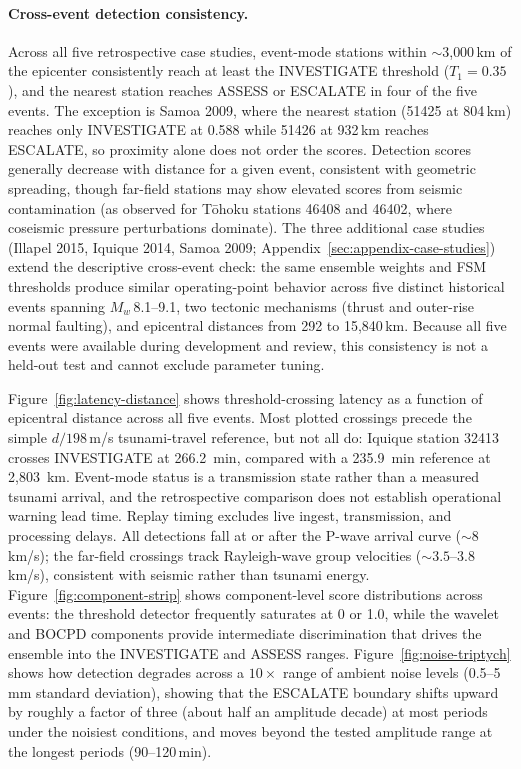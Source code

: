 \documentclass{article}
\begin{document}
\paragraph{Cross-event detection consistency.}
Across all five retrospective case studies, event-mode stations
within $\sim$3{,}000\,km of the epicenter consistently reach at
least the INVESTIGATE threshold ($T_1 = 0.35$), and the nearest
station reaches ASSESS or ESCALATE in four of the five events.
The exception is Samoa 2009, where the nearest station (51425 at
804\,km) reaches only INVESTIGATE at 0.588 while 51426 at 932\,km
reaches ESCALATE, so proximity alone does not order the scores.
Detection scores generally decrease with distance for a
given event, consistent with geometric spreading, though
far-field stations may show elevated scores from seismic
contamination (as observed for T\={o}hoku stations 46408 and
46402, where coseismic pressure perturbations dominate).
The three additional case studies (Illapel 2015, Iquique 2014,
Samoa 2009; Appendix~\ref{sec:appendix-case-studies}) extend the
descriptive cross-event check: the same ensemble weights and FSM
thresholds produce similar operating-point behavior across five
distinct historical events spanning $M_w$\,8.1--9.1, two tectonic
mechanisms (thrust and outer-rise normal faulting), and epicentral
distances from 292 to 15{,}840\,km. Because all five events were
available during development and review, this consistency is not a
held-out test and cannot exclude parameter tuning.

Figure~\ref{fig:latency-distance} shows threshold-crossing latency as a
function of epicentral distance across all five events. Most plotted
crossings precede the simple $d/198$\,m/s tsunami-travel reference, but
not all do: Iquique station 32413 crosses INVESTIGATE at 266.2~min,
compared with a 235.9~min reference at 2{,}803~km. Event-mode status is
a transmission state rather than a measured tsunami arrival, and the
retrospective comparison does not establish operational warning lead
time. Replay timing excludes live ingest, transmission, and processing
delays.
All detections fall at or after the P-wave arrival curve
(${\sim}8$\,km/s); the far-field crossings track Rayleigh-wave
group velocities (${\sim}3.5$--$3.8$\,km/s), consistent with
seismic rather than tsunami energy.
Figure~\ref{fig:component-strip} shows component-level score
distributions across events: the threshold detector frequently
saturates at 0 or 1.0, while the wavelet and BOCPD components
provide intermediate discrimination that drives the ensemble
into the INVESTIGATE and ASSESS ranges.
Figure~\ref{fig:noise-triptych} shows how detection degrades across a
$10\times$ range of ambient noise levels
(0.5--5\,mm standard deviation), showing that the ESCALATE boundary
shifts upward by roughly a factor of three (about half an amplitude
decade) at most periods under the noisiest conditions, and moves
beyond the tested amplitude range at the longest periods
(90--120\,min).
\end{document}
